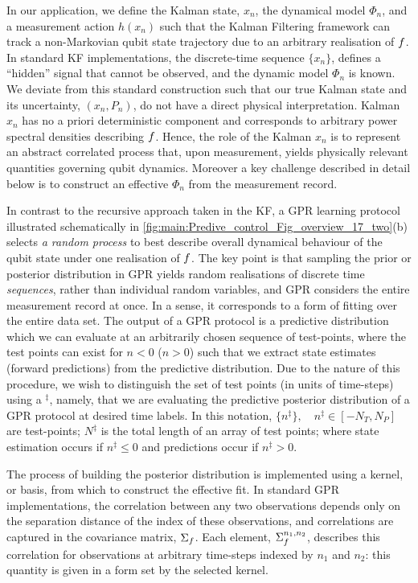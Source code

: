 In our application, we define the Kalman state, $x_n$, the dynamical model $\Phi_n$, and a measurement action $h(x_n)$ such that the Kalman Filtering framework can track a non-Markovian qubit state trajectory due to an arbitrary realisation of $f$. In standard KF implementations, the discrete-time sequence $\{x_n\}$, defines a ``hidden'' signal that cannot be observed, and the dynamic model $\Phi_n$ is known.  We deviate from this standard construction such that our true Kalman state and its uncertainty, $(x_n, P_n)$, do not have a direct physical interpretation.  Kalman $x_n$ has no a priori deterministic component and corresponds to arbitrary power spectral densities describing $f$. Hence, the role of the Kalman $x_n$ is to represent an abstract correlated process that, upon measurement, yields physically relevant quantities governing qubit dynamics.  Moreover a key challenge described in detail below is to construct an effective $\Phi_{n}$ from the measurement record.   

In contrast to the recursive approach taken in the KF, a GPR learning protocol illustrated schematically in \cref{fig:main:Predive_control_Fig_overview_17_two}(b) selects \textit{a random process} to best describe overall dynamical behaviour of the qubit state under one realisation of $f$. The key point is that sampling the prior or posterior distribution in GPR yields random realisations of discrete time \textit{sequences}, rather than individual random variables, and GPR considers the entire measurement record at once.  In a sense, it corresponds to a form of fitting over the entire data set.  The output of a GPR protocol is a predictive distribution which we can evaluate at an arbitrarily chosen sequence of test-points, where the test points can exist  for $n<0$ ($n>0$) such that we extract state estimates (forward predictions) from the predictive distribution. Due to the nature of this procedure, we wish to distinguish the set of test points (in units of time-steps)  using a ${}^\ddagger$, namely, that we are evaluating the predictive posterior distribution of a GPR protocol at desired time labels. In this notation, $\{ n^{\ddagger} \}, \quad n^{\ddagger} \in [-N_T, N_P]$ are test-points; $N^{\ddagger}$ is the total length of an array of test points; where state estimation occurs if $n^{\ddagger} \leq 0$ and predictions occur if $n^{\ddagger}>0$. 

The process of building the posterior distribution is implemented using a kernel, or basis, from which to construct the effective fit.  In standard GPR implementations, the correlation between any two observations depends only on the separation distance of the index of these observations, and correlations are captured in the covariance matrix, $\Sigma_f$. Each element, $\Sigma_f^{n_1, n_2}$, describes this correlation for observations at arbitrary time-steps indexed by $n_1$ and $n_2$: this quantity is given in a form set by the selected kernel. 


